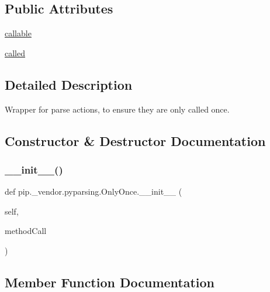 \subsection*{Public Attributes}
\begin{DoxyCompactItemize}
\item 
\hyperlink{classpip_1_1__vendor_1_1pyparsing_1_1OnlyOnce_ad6abd3aebe568fa642a2c76b7cd35dbc}{callable}
\item 
\hyperlink{classpip_1_1__vendor_1_1pyparsing_1_1OnlyOnce_a1431639d0a042ffb61479adcb092d518}{called}
\end{DoxyCompactItemize}


\subsection{Detailed Description}
\begin{DoxyVerb}Wrapper for parse actions, to ensure they are only called once.
\end{DoxyVerb}
 

\subsection{Constructor \& Destructor Documentation}
\mbox{\label{classpip_1_1__vendor_1_1pyparsing_1_1OnlyOnce_a1740629229edd90ff9552f2776c76025}} 
\subsubsection{\texorpdfstring{\+\_\+\+\_\+init\+\_\+\+\_\+()}{\_\_init\_\_()}}
{\footnotesize\ttfamily def pip.\+\_\+vendor.\+pyparsing.\+Only\+Once.\+\_\+\+\_\+init\+\_\+\+\_\+ (\begin{DoxyParamCaption}\item[{}]{self,  }\item[{}]{method\+Call }\end{DoxyParamCaption})}



\subsection{Member Function Documentation}
\mbox{\label{classpip_1_1__vendor_1_1pyparsing_1_1OnlyOnce_a2eb8c76ede0a7a0bc39389a2026ec8df}} 
